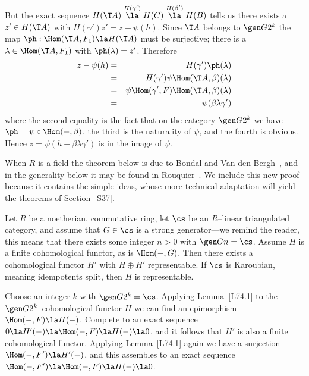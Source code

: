 \documentclass[11pt]{amsart}
\begin{document}
But the exact sequence
$H(\T A)\stackrel{H(\gamma')}\la H(C)\stackrel{H(\beta')}\la H(B)$
tells us there exists a $z'\in H(\T A)$ with
$H(\gamma')z'=z-\psi(h)$. Since $\T A$ belongs
to $\gen G{2^k}$ the map $\ph:\Hom(\T A,F_1)\la H(\T A)$ must be
surjective; there is a $\lambda\in\Hom(\T A,F_1)$ with
$\ph(\lambda)=z'$. Therefore
\begin{eqnarray*}
  z-\psi(h) &=& H(\gamma')\ph(\lambda) \\
  &=& H(\gamma')\psi\Hom(\T A,\beta)(\lambda)\\
  &=&\psi\Hom(\gamma',F)\Hom(\T A,\beta)(\lambda)\\
  &=&\psi(\beta\lambda\gamma')
\end{eqnarray*}
where the second equality is the fact that
on the category $\gen G{2^k}$ we have $\ph=\psi\circ\Hom(-,\beta)$,
the third is the naturality of $\psi$, and the fourth is obvious.
Hence $z=\psi(h+\beta\lambda\gamma')$ is in the image of $\psi$.
\eprf

 When $R$ is a field the theorem below is due to Bondal and Van den
Bergh~\cite[Theorem~1.3]{BondalvandenBergh04}, and
in the generality below it may be found in
Rouquier~\cite[Theorem~4.16 and Corollary~4.18]{Rouquier08}. We include
this new proof because it contains the simple ideas, whose more technical
adaptation will yield the theorems of Section~\ref{S37}.


Let $R$ be a noetherian, commutative ring, let $\cs$ be an $R$--linear
triangulated category, and assume that $G\in\cs$ is a
strong generator---we remind the reader, this means that
there exists some integer $n>0$ with $\gen Gn=\cs$. Assume $H$
is a finite cohomological functor, as is $\Hom(-,G)$. Then
there exists a cohomological functor $H'$ with $H\oplus H'$
representable. If $\cs$ is Karoubian, meaning idempotents split,
then $H$ is representable.
\ethm

\prf
Choose an integer $k$ with $\gen G{2^k}=\cs$. Applying
Lemma~\ref{L74.1} to the $\gen G{2^k}$--cohomological functor
$H$ we can find an epimorphism $\Hom(-,F)\la H(-)$.
Complete to an exact sequence $0\la H'(-)\la \Hom(-,F)\la H(-)\la 0$,
and it follows that $H'$ is also a finite cohomological functor.
Applying Lemma~\ref{L74.1} again we have a surjection
$\Hom(-,F')\la H'(-)$, and this assembles to an exact
sequence $\Hom(-,F')\la\Hom(-,F)\la H(-)\la 0$.
\end{document}
